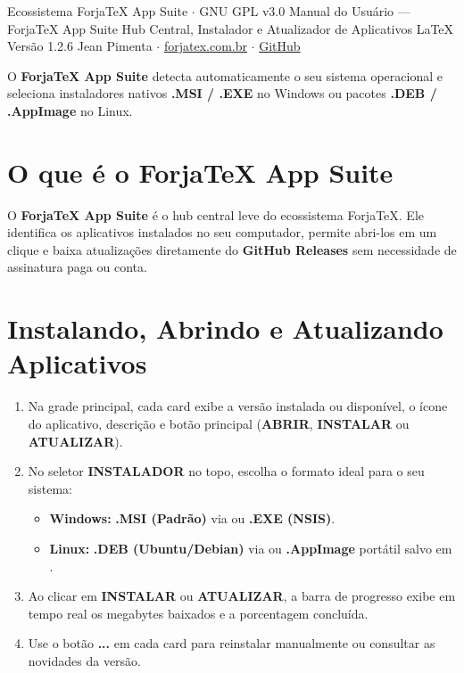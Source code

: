 \documentclass[11pt,a4paper]{article}
\begin{document}
  {Ecossistema ForjaTeX App Suite $\cdot$ GNU GPL v3.0}
  {Manual do Usuário --- ForjaTeX App Suite}
  {Hub Central, Instalador e Atualizador de Aplicativos \LaTeX{}}
  {Versão 1.2.6}
  {Jean Pimenta $\cdot$ \href{https://forjatex.com.br}{\color{fjsky}forjatex.com.br} $\cdot$ \href{https://github.com/jeanjpimenta/forjatex-suite}{\color{fjsky}GitHub}}


\begin{fjcallout}
O \textbf{ForjaTeX App Suite} detecta automaticamente o seu sistema operacional e seleciona instaladores nativos \textbf{.MSI / .EXE} no Windows ou pacotes \textbf{.DEB / .AppImage} no Linux.
\end{fjcallout}

\section{O que é o ForjaTeX App Suite}
O \textbf{ForjaTeX App Suite} é o hub central leve do ecossistema ForjaTeX. Ele identifica os aplicativos instalados no seu computador, permite abri-los em um clique e baixa atualizações diretamente do \textbf{GitHub Releases} sem necessidade de assinatura paga ou conta.

\section{Instalando, Abrindo e Atualizando Aplicativos}
\begin{enumerate}
  \item Na grade principal, cada card exibe a versão instalada ou disponível, o ícone do aplicativo, descrição e botão principal (\textbf{ABRIR}, \textbf{INSTALAR} ou \textbf{ATUALIZAR}).
  \item No seletor \textbf{INSTALADOR} no topo, escolha o formato ideal para o seu sistema:
  \begin{itemize}
    \item \textbf{Windows:} \textbf{.MSI (Padrão)} via  ou \textbf{.EXE (NSIS)}.
    \item \textbf{Linux:} \textbf{.DEB (Ubuntu/Debian)} via  ou \textbf{.AppImage} portátil salvo em .
  \end{itemize}
  \item Ao clicar em \textbf{INSTALAR} ou \textbf{ATUALIZAR}, a barra de progresso exibe em tempo real os megabytes baixados e a porcentagem concluída.
  \item Use o botão \textbf{...} em cada card para reinstalar manualmente ou consultar as novidades da versão.
\end{enumerate}
\end{document}
